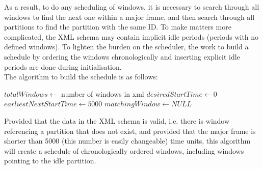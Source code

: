 As a result, to do any scheduling of windows, it is necessary to search through
all windows to find the next one within a major frame, and then search through
all partitions to find the partition with the same ID. To make matters more
complicated, the XML schema may contain implicit idle periods (periods with no
defined windows). To lighten the burden on the scheduler, the work to build a
schedule by ordering the windows chronologically and inserting explicit idle
periods are done during initialisation.\\

The algorithm to build the schedule is as follows:\\
\begin{algorithm}[H]
$totalWindows \leftarrow$ number of windows in xml\;
$desiredStartTime \leftarrow 0$\;
$earliestNextStartTime \leftarrow 5000$\;
$matchingWindow \leftarrow NULL$\;
\end{algorithm}

Provided that the data in the XML schema is valid, i.e. there is window 
referencing a partition that does not exist, and provided that the major frame
is shorter than 5000 (this number is easily changeable) time units, this
algorithm will create a schedule of chronologically ordered windows, including
windows pointing to the idle partition.\\

